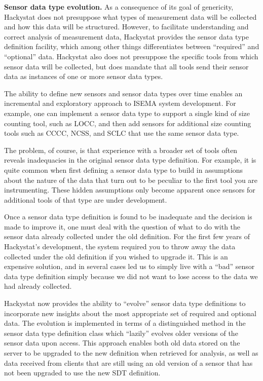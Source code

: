 \documentclass[10pt,twocolumn]{article}
\begin{document}
{\bf Sensor data type evolution.} As a consequence of its goal of 
genericity, Hackystat does not presuppose what types of measurement data 
will be collected and how this data will be structured.  However, to 
facilitate understanding and correct analysis of measurement data, 
Hackystat provides the sensor data type definition facility, which 
among other things differentiates between ``required'' and ``optional''
data.  Hackystat also does not presuppose the specific tools from which
sensor data will be collected, but does mandate that all tools send
their sensor data as instances of one or more sensor data types. 

The ability to define new sensors and sensor data types over time enables
an incremental and exploratory approach to ISEMA system development. For
example, one can implement a sensor data type to support a single kind of 
size counting tool, such as LOCC, and then add sensors for additional 
size counting tools such as CCCC, NCSS, and SCLC that use the same 
sensor data type.  

The problem, of course, is that experience with a broader set of tools
often reveals inadequacies in the original sensor data type definition.
For example, it is quite common when first defining a sensor data type to
build in assumptions about the nature of the data that turn out to be
peculiar to the first tool you are instrumenting. These hidden assumptions
only become apparent once sensors for additional tools of that type are
under development.   

Once a sensor data type definition is found to be inadequate and the
decision is made to improve it, one must deal with the question of what to
do with the sensor data already collected under the old definition.  For
the first few years of Hackystat's development, the system required you to
throw away the data collected under the old definition if you wished to
upgrade it.  This is an expensive solution, and in several cases led us to
simply live with a ``bad'' sensor data type definition simply because we
did not want to lose access to the data we had already collected.

Hackystat now provides the ability to ``evolve'' sensor data type
definitions to incorporate new insights about the most appropriate set of
required and optional data.  The evolution is implemented in terms of a
distinguished method in the sensor data type definition class which ``lazily'' 
evolves older versions of the sensor data upon access. This approach 
enables both old data stored on the server to be upgraded to the new
definition when retrieved for analysis, as well as data received from
clients that are still using an old version of a sensor that has not been
upgraded to use the new SDT definition.  
\end{document}
